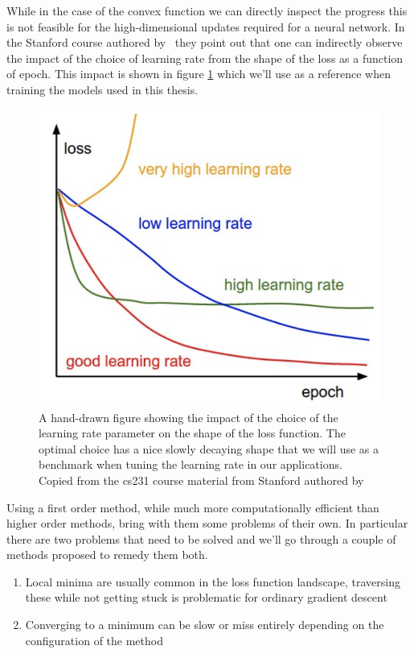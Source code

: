 \noindent While in the case of the convex function we can directly inspect the progress this is not feasible for the high-dimensional updates required for a neural network. In the Stanford course authored by \citet{Karpathy} they point out that one can indirectly observe the impact of the choice of learning rate from the shape of the loss as a function of epoch. This impact is shown in figure \ref{fig:lrloss} which we'll use as a reference when training the models used in this thesis. 

\begin{figure}[H]
\centering
\includegraphics{../figures/lr_loss.png}
\caption{A hand-drawn figure showing the impact of the choice of the learning rate parameter on the shape of the loss function. The optimal choice has a nice slowly decaying shape that we will use as a benchmark when tuning the learning rate in our applications. Copied from the cs231 course material from Stanford authored by \citet{Karpathy}}\label{fig:lrloss}

\end{figure} 

\noindent Using a first order method, while much more computationally efficient than higher order methods, bring with them some problems of their own. In particular there are two problems that need to be solved and we'll go through a couple of methods proposed to remedy them both. 


\begin{enumerate}[start=0, label={(\bfseries C\arabic*):}]
\item Local minima are usually common in the loss function landscape, traversing these while not getting stuck is problematic for ordinary gradient descent
\item Converging to a minimum  can be slow or miss entirely depending on the configuration of the method 
\end{enumerate}

